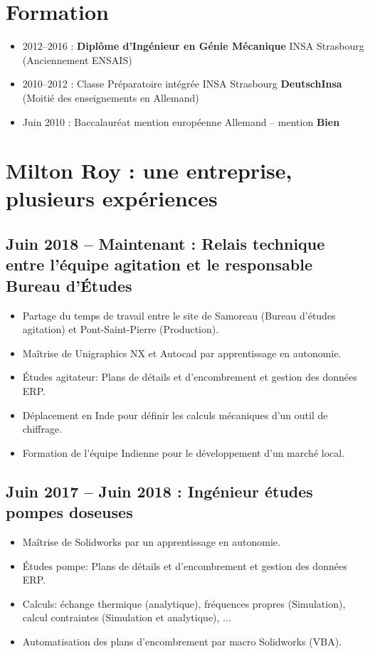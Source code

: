 \documentclass[10pt,a4paper,sans]{article}
\begin{document}
\begin{minipage}[t]{0.68\textwidth}
    \vspace{0.15cm}
    \section{Formation}
        \begin{itemize}
            \item{2012--2016 : \textbf{Diplôme d'Ingénieur en Génie Mécanique} INSA Strasbourg (Anciennement ENSAIS)}
            \item{2010--2012 : Classe Préparatoire intégrée INSA Strasbourg \textbf{DeutschInsa} \newline (Moitié des enseignements en Allemand)}
            \item{Juin 2010 : Baccalauréat mention européenne Allemand -- mention \textbf{Bien}}
        \end{itemize}

    \section{Milton Roy : une entreprise, plusieurs expériences}
    \subsection{Juin 2018 -- Maintenant : Relais technique entre l'équipe agitation et le responsable Bureau d'Études}
    \begin{itemize}%
        \item{Partage du temps de travail entre le site de Samoreau (Bureau d'études agitation) et Pont-Saint-Pierre (Production).}
        \item{Maîtrise de Unigraphics NX et Autocad par apprentissage en autonomie.}
        \item{Études agitateur: Plans de détails et d'encombrement et gestion des données ERP.}
        \item{Déplacement en Inde pour définir les calculs mécaniques d'un outil de chiffrage.} 
        \item{Formation de l’équipe Indienne pour le développement d’un marché local.}
    \end{itemize}

    \subsection{Juin 2017 -- Juin 2018 : Ingénieur études pompes doseuses}
    \begin{itemize}
        \item{Maîtrise de Solidworks par un apprentissage en autonomie.}
        \item{Études pompe: Plans de détails et d'encombrement et gestion des données ERP.}
        \item{Calculs: échange thermique (analytique), fréquences propres (Simulation), calcul contraintes (Simulation et analytique), ...}
        \item{Automatisation des plans d’encombrement par macro Solidworks (VBA).}
    \end{itemize}


\end{minipage}
\end{document}
